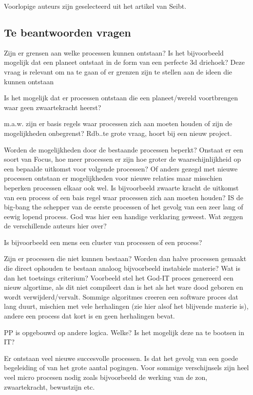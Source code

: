 \documentclass[a4paper]{Thesis}
\begin{document}
Voorlopige auteurs zijn geselecteerd uit het artikel van Seibt.

\subsection{Te beantwoorden vragen}
Zijn er grensen aan welke processen kunnen ontstaan? Is het bijvoorbeeld mogelijk dat een planeet ontstaat in de form van een perfecte 3d driehoek?
Deze vraag is relevant om na te gaan of er grenzen zijn te stellen aan de ideen die kunnen ontstaan

Is het mogelijk dat er processen ontstaan die een planeet/wereld voortbrengen waar geen zwaartekracht heerst?

m.a.w. zijn er basis regels waar processen zich aan moeten houden of zijn de mogelijkheden onbegrenst? 
Rdb..te grote vraag, hoort bij een nieuw project.

Worden de mogelijkheden door de bestaande processen beperkt? Onstaat er een soort van Focus, hoe meer processen er zijn hoe groter de waarschijnlijkheid op een bepaalde uitkomst voor volgende processen? Of anders gezegd met nieuwe processen ontstaan er mogelijkheden voor nieuwe relaties maar misschien beperken processen elkaar ook wel.
Is bijvoorbeeld zwaarte kracht de uitkomst van een process of een bais regel waar processen zich aan moeten houden?
IS de big-bang the schepper van de eerste processen of het gevolg van een zeer lang of eewig lopend process. God was hier een handige verklaring geweest.
Wat zeggen de verschillende auteurs hier over?

Is bijvoorbeeld een mens een cluster van processen of een process?

Zijn er processen die niet kunnen bestaan? Worden dan halve processen gemaakt die direct ophouden te bestaan analoog bijvoorbeeld instabiele materie?
Wat is dan het toetsings criterium? Voorbeeld stel het God-IT proces genereerd een nieuw algortime, als dit niet compileert dan is het als het ware dood geboren en wordt verwijderd/vervalt. Sommige algoritmes creeren een software proces dat lang duurt, mischien met vele herhalingen (zie hier alsof het blijvende materie is), andere een process dat kort is en geen herhalingen bevat.

PP is opgebouwd op andere logica. Welke? Is het mogelijk deze na te bootsen in IT?

Er ontstaan veel nieuwe succesvolle processen. Is dat het gevolg van een goede begeleiding of van het grote aantal pogingen. Voor sommige verschijnsels zijn heel veel micro procesen nodig zoals bijvoorbeeld de werking van de zon, zwaartekracht, bewustzijn etc.
\end{document}
